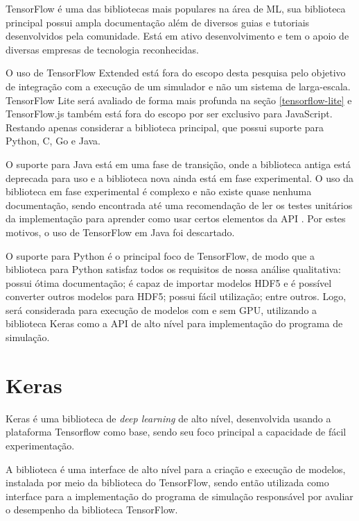 TensorFlow é uma das bibliotecas mais populares na área de ML, sua biblioteca principal possui ampla documentação além de diversos guias e tutoriais desenvolvidos pela comunidade. Está em ativo desenvolvimento e tem o apoio de diversas empresas de tecnologia reconhecidas.

O uso de TensorFlow Extended está fora do escopo desta pesquisa pelo objetivo de integração com a execução de um simulador e não um sistema de larga-escala. TensorFlow Lite será avaliado de forma mais profunda na seção \ref{tensorflow-lite} e TensorFlow.js também está fora do escopo por ser exclusivo para JavaScript. Restando apenas considerar a biblioteca principal, que possui suporte para Python, C, Go e Java.

O suporte para Java está em uma fase de transição, onde a biblioteca antiga está deprecada para uso e a biblioteca nova ainda está em fase experimental. O uso da biblioteca em fase experimental é complexo e não existe quase nenhuma documentação, sendo encontrada até uma recomendação de ler os testes unitários da implementação para aprender como usar certos elementos da \acrshort{API} \cite{tensorflow-unit-test-recommendation}. Por estes motivos, o uso de TensorFlow em Java foi descartado.

O suporte para Python é o principal foco de TensorFlow, de modo que a biblioteca para Python satisfaz todos os requisitos de nossa análise qualitativa: possui ótima documentação; é capaz de importar modelos HDF5 e é possível converter outros modelos para HDF5; possui fácil utilização; entre outros. Logo, será considerada para execução de modelos com e sem GPU, utilizando a biblioteca Keras como a \acrshort{API} de alto nível para implementação do programa de simulação.

\section{Keras}

Keras \cite{chollet2015keras} é uma biblioteca de \textit{deep learning} de alto nível, desenvolvida usando a plataforma Tensorflow como base, sendo seu foco principal a capacidade de fácil experimentação.

A biblioteca é uma interface de alto nível para a criação e execução de modelos, instalada por meio da biblioteca do TensorFlow, sendo então utilizada como interface para a implementação do programa de simulação responsável por avaliar o desempenho da biblioteca TensorFlow.

